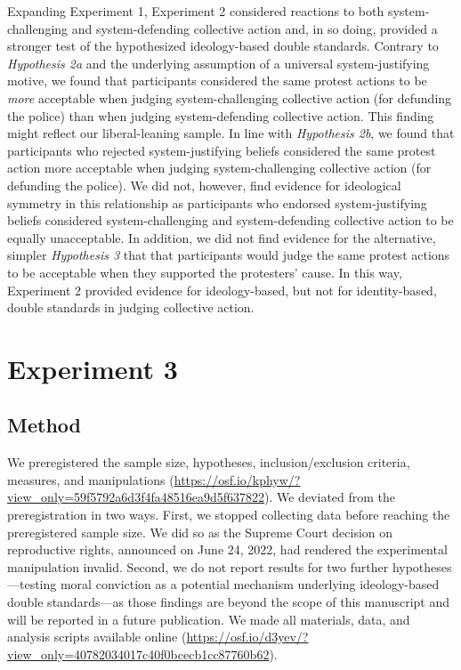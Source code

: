 \documentclass[twocolumn, 11pt, letterpaper]{article}
\begin{document}
Expanding Experiment 1, Experiment 2 considered reactions to both
system-challenging and system-defending collective action and, in so
doing, provided a stronger test of the hypothesized ideology-based
double standards. Contrary to \emph{Hypothesis 2a} and the underlying
assumption of a universal system-justifying motive, we found that
participants considered the same protest actions to be \emph{more}
acceptable when judging system-challenging collective action (for
defunding the police) than when judging system-defending collective
action. This finding might reflect our liberal-leaning sample. In line
with \emph{Hypothesis 2b}, we found that participants who rejected
system-justifying beliefs considered the same protest action more
acceptable when judging system-challenging collective action (for
defunding the police). We did not, however, find evidence for
ideological symmetry in this relationship as participants who endorsed
system-justifying beliefs considered system-challenging and
system-defending collective action to be equally unacceptable. In
addition, we did not find evidence for the alternative, simpler
\emph{Hypothesis 3} that that participants would judge the same protest
actions to be acceptable when they supported the protesters' cause. In
this way, Experiment 2 provided evidence for ideology-based, but not for
identity-based, double standards in judging collective action.

\hypertarget{experiment-3}{%
\section{Experiment 3}\label{experiment-3}}

\hypertarget{method-2}{%
\subsection{Method}\label{method-2}}

We preregistered the sample size, hypotheses, inclusion/exclusion
criteria, measures, and manipulations
(\url{https://osf.io/kphyw/?view_only=59f5792a6d3f4fa48516ea9d5f637822}).
We deviated from the preregistration in two ways. First, we stopped
collecting data before reaching the preregistered sample size. We did so
as the Supreme Court decision on reproductive rights, announced on June
24, 2022, had rendered the experimental manipulation invalid. Second, we
do not report results for two further hypotheses---testing moral
conviction as a potential mechanism underlying ideology-based double
standards---as those findings are beyond the scope of this manuscript
and will be reported in a future publication. We made all materials,
data, and analysis scripts available online
(\url{https://osf.io/d3yev/?view_only=40782034017c40f0bcecb1cc87760b62}).
\end{document}
